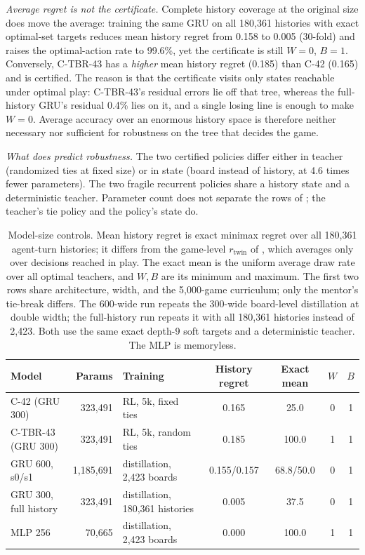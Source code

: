 \documentclass[conference]{IEEEtran}
\begin{document}
\emph{Average regret is not the certificate.} Complete history coverage at the original size does move the average: training the same GRU on all 180{,}361 histories with exact optimal-set targets reduces mean history regret from 0.158 to 0.005 (30-fold) and raises the optimal-action rate to 99.6\%, yet the certificate is still $W=0$, $B=1$. Conversely, C-TBR-43 has a \emph{higher} mean history regret (0.185) than C-42 (0.165) and is certified. The reason is that the certificate visits only states reachable under optimal play: C-TBR-43's residual errors lie off that tree, whereas the full-history GRU's residual 0.4\% lies on it, and a single losing line is enough to make $W=0$. Average accuracy over an enormous history space is therefore neither necessary nor sufficient for robustness on the tree that decides the game.

\emph{What does predict robustness.} The two certified policies differ either in teacher (randomized ties at fixed size) or in state (board instead of history, at 4.6 times fewer parameters). The two fragile recurrent policies share a history state and a deterministic teacher. Parameter count does not separate the rows of ; the teacher's tie policy and the policy's state do.

\begin{table}[t]
\centering
\caption{Model-size controls. Mean history regret is exact minimax regret over all 180{,}361 agent-turn histories; it differs from the game-level $r_{\text{twin}}$ of , which averages only over decisions reached in play. The exact mean is the uniform average draw rate over all optimal teachers, and $W,B$ are its minimum and maximum. The first two rows share architecture, width, and the 5{,}000-game curriculum; only the mentor's tie-break differs. The 600-wide run repeats the 300-wide board-level distillation at double width; the full-history run repeats it with all 180{,}361 histories instead of 2{,}423. Both use the same exact depth-9 soft targets and a deterministic teacher. The MLP is memoryless.}
\label{tab:size}
\small
\begin{tabular*}{\textwidth}{@{\extracolsep{\fill}}lrlcccc@{}}
\toprule
\textbf{Model} & \textbf{Params} & \textbf{Training} & \textbf{History regret} & \textbf{Exact mean} & $W$ & $B$ \\
\midrule
C-42 (GRU 300) & 323{,}491 & RL, 5k, fixed ties & 0.165 & 25.0 & 0 & 1 \\
C-TBR-43 (GRU 300) & 323{,}491 & RL, 5k, random ties & 0.185 & 100.0 & 1 & 1 \\
GRU 600, s0/s1 & 1{,}185{,}691 & distillation, 2{,}423 boards & 0.155/0.157 & 68.8/50.0 & 0 & 1 \\
GRU 300, full history & 323{,}491 & distillation, 180{,}361 histories & 0.005 & 37.5 & 0 & 1 \\
MLP 256 & 70{,}665 & distillation, 2{,}423 boards & 0.000 & 100.0 & 1 & 1 \\
\bottomrule
\end{tabular*}
\end{table}
\end{document}
